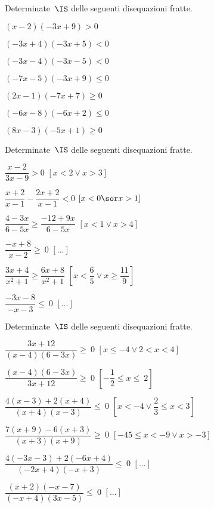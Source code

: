 \begin{esercizio}[]
\label{ese:dis_}
Determinate~\(\IS\) delle seguenti disequazioni fratte.
\begin{htmulticols}{2}
\begin{enumeratea}
\spazielenx
\item \((x-2)(-3x+9)>0\)
\item \((-3x+4)(-3x+5)<0\)
\item \((-3x-4)(-3x-5)<0\)
\item \((-7x-5)(-3x+9)\le0\)
\item \((2x-1)(-7x+7)\ge0\)
\item \((-6x-8)(-6x+2)\le0\)
\item \((8x-3)(-5x+1)\ge0\)
\end{enumeratea}
\end{htmulticols}
\end{esercizio}

\begin{esercizio}[]
\label{ese:21.55}
Determinate~\(\IS\) delle seguenti disequazioni fratte.
\begin{htmulticols}{2}
\begin{enumeratea}
\spazielenx
\item \(\dfrac{x-2}{3x-9}>0\) \hfill \(\left[x<2\vee x>3\right]\)
\item \(\dfrac{x+2}{x-1}-\dfrac{2x+2}{x-1} < 0\) 
\hfill \(\left[x< 0 \sor x>1\right]\)
\item \(\dfrac{4-3x}{6-5x}\geqslant \dfrac{-12+9x}{6-5x}\) 
\hfill \(\left[x<1\vee x>4\right]\)
\item \(\dfrac{-x+8}{x-2}\ge~0\) \hfill \(\left[...\right]\)
\item \(\dfrac{3x+4}{x^{2}+1}\ge\dfrac{6x+8}{x^{2}+1}\) 
 \hfill \(\left[x<\dfrac{6}{5}\vee x\ge\dfrac{11}{9}\right]\)
\item \(\dfrac{-3x-8}{-x-3}\le~0\) \hfill \(\left[...\right]\)
\end{enumeratea}
\end{htmulticols}
\end{esercizio}

\begin{esercizio}[]
\label{ese:21.55}
Determinate~\(\IS\) delle seguenti disequazioni fratte.
\begin{enumeratea}
\spazielenx
\item \(\dfrac{3x+12}{(x-4)(6-3x)}\geqslant~0\)
 \hfill \(\left[x\le -4 \vee 2<x<4\right]\)
\item \(\dfrac{(x-4)(6-3x)}{3x+12}\geqslant~0\)
 \hfill \(\left[-{\dfrac{1}{2}}\le x\le~2\right]\)
\item \(\dfrac{4(x-3)+2(x+4)}{(x+4)(x-3)}\leqslant~0\)
 \hfill \(\left[x<-4\vee\dfrac{2}{3}\le x<3\right]\)
\item \(\dfrac{7(x+9)-6(x+3)}{(x+3)(x+9)}\geqslant~0\)
 \hfill \(\left[-45\le x<-9\vee x>-3\right]\)
\item \(\dfrac{4(-3x-3)+2(-6x+4)}{(-2x+4)(-x+3)}\leqslant~0\)
 \hfill \(\left[...\right]\)
\item \(\dfrac{(x+2)(-x-7)}{(-x+4)(3x-5)}\leqslant~0\)
 \hfill \(\left[...\right]\)
\end{enumeratea}
\end{esercizio}

